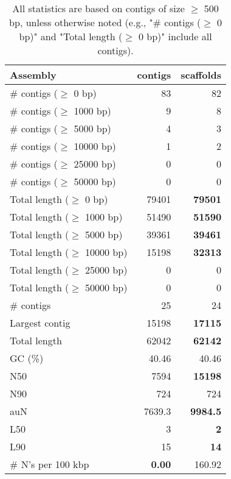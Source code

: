 \documentclass[12pt,a4paper]{article}
\begin{document}
\begin{table}[ht]
\begin{center}
\caption{All statistics are based on contigs of size $\geq$ 500 bp, unless otherwise noted (e.g., "\# contigs ($\geq$ 0 bp)" and "Total length ($\geq$ 0 bp)" include all contigs).}
\begin{tabular}{|l*{2}{|r}|}
\hline
Assembly & contigs & scaffolds \\ \hline
\# contigs ($\geq$ 0 bp) & 83 & 82 \\ \hline
\# contigs ($\geq$ 1000 bp) & 9 & 8 \\ \hline
\# contigs ($\geq$ 5000 bp) & 4 & 3 \\ \hline
\# contigs ($\geq$ 10000 bp) & 1 & 2 \\ \hline
\# contigs ($\geq$ 25000 bp) & 0 & 0 \\ \hline
\# contigs ($\geq$ 50000 bp) & 0 & 0 \\ \hline
Total length ($\geq$ 0 bp) & 79401 & {\bf 79501} \\ \hline
Total length ($\geq$ 1000 bp) & 51490 & {\bf 51590} \\ \hline
Total length ($\geq$ 5000 bp) & 39361 & {\bf 39461} \\ \hline
Total length ($\geq$ 10000 bp) & 15198 & {\bf 32313} \\ \hline
Total length ($\geq$ 25000 bp) & 0 & 0 \\ \hline
Total length ($\geq$ 50000 bp) & 0 & 0 \\ \hline
\# contigs & 25 & 24 \\ \hline
Largest contig & 15198 & {\bf 17115} \\ \hline
Total length & 62042 & {\bf 62142} \\ \hline
GC (\%) & 40.46 & 40.46 \\ \hline
N50 & 7594 & {\bf 15198} \\ \hline
N90 & 724 & 724 \\ \hline
auN & 7639.3 & {\bf 9984.5} \\ \hline
L50 & 3 & {\bf 2} \\ \hline
L90 & 15 & {\bf 14} \\ \hline
\# N's per 100 kbp & {\bf 0.00} & 160.92 \\ \hline
\end{tabular}
\end{center}
\end{table}
\end{document}
